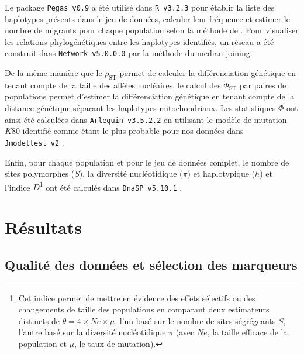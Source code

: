 \documentclass[a4paper,12pt,twoside]{article}\usepackage[]{graphicx}\usepackage[]{color}
\begin{document}
\begin {bibunit} [newbst]
Le package \texttt{Pegas~v0.9} \citep{paradis2010} a été utilisé dans \texttt{R~v3.2.3} \citep{rct2015} pour établir la liste des haplotypes présents dans le jeu de données, calculer leur fréquence et estimer le nombre de migrants pour chaque population selon la méthode de \citet{barton1986}. Pour visualiser les relations phylogénétiques entre les haplotypes identifiés, un réseau a été construit dans \texttt{Network~v5.0.0.0} \citep{bandelt1999} par la méthode du median-joining \citep{cassens2003}.

De la même manière que le $\rho_\textrm{ST}$ permet de calculer la différenciation génétique en tenant compte de la taille des allèles nucléaires, le calcul des $\Phi_\textrm{ST}$ par paires de populations permet d'estimer la différenciation génétique en tenant compte de la distance génétique séparant les haplotypes mitochondriaux. Les statistiques $\Phi$ ont ainsi été calculées dans \texttt{Arlequin~v3.5.2.2} \citep{excoffier2010} en utilisant le modèle de mutation $K80$ identifié comme étant le plus probable pour nos données dans \texttt{Jmodeltest~v2} \citep{santorum2014}.

Enfin, pour chaque population et pour le jeu de données complet, le nombre de sites polymorphes ($S$), la diversité nucléotidique ($\pi$) et haplotypique ($h$) \citep[selon la méthode décrite par][]{tajima1983} et l'indice $D$\footnote{Cet indice permet de mettre en évidence des effets sélectifs ou des changements de taille des populations en comparant deux estimateurs distincts de $\theta = 4\times Ne \times \mu$, l'un basé sur le nombre de sites ségrégeants $S$, l'autre basé sur la diversité nucléotidique $\pi$ (avec $Ne$, la taille efficace de la population et $\mu$, le taux de mutation).} \citep{tajima1989} ont été calculés dans \texttt{DnaSP~v5.10.1} \citep{librado2009}.


\section{Résultats}



\subsection{Qualité des données et sélection des marqueurs}


\end{bibunit}
\end{document}
